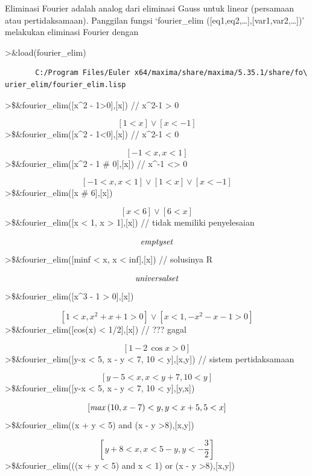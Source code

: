 \documentclass[
]{book}
\begin{document}
Eliminasi Fourier adalah analog dari eliminasi Gauss untuk linear (persamaan atau pertidaksamaan). Panggilan fungsi `fourier\_elim ({[}eq1,eq2,\ldots{]},{[}var1,var2,\ldots{]})' melakukan eliminasi Fourier dengan

\textgreater\&load(fourier\_elim)

\begin{verbatim}
       C:/Program Files/Euler x64/maxima/share/maxima/5.35.1/share/fo\
urier_elim/fourier_elim.lisp
\end{verbatim}

\textgreater\$\&fourier\_elim({[}x\^{}2 - 1\textgreater0{]},{[}x{]}) // x\^{}2-1 \textgreater{} 0

\[\left[ 1<x \right] \lor \left[ x<-1 \right] \]\textgreater\$\&fourier\_elim({[}x\^{}2 - 1\textless0{]},{[}x{]}) // x\^{}2-1 \textless{} 0

\[\left[ -1<x , x<1 \right] \]\textgreater\$\&fourier\_elim({[}x\^{}2 - 1 \# 0{]},{[}x{]}) // x\^{}-1 \textless\textgreater{} 0

\[\left[ -1<x , x<1 \right] \lor \left[ 1<x \right] \lor \left[ x<-1   \right] \]\textgreater\$\&fourier\_elim({[}x \# 6{]},{[}x{]})

\[\left[ x<6 \right] \lor \left[ 6<x \right] \]\textgreater\$\&fourier\_elim({[}x \textless{} 1, x \textgreater{} 1{]},{[}x{]}) // tidak memiliki penyelesaian

\[{\it emptyset}\]\textgreater\$\&fourier\_elim({[}minf \textless{} x, x \textless{} inf{]},{[}x{]}) // solusinya R

\[{\it universalset}\]\textgreater\$\&fourier\_elim({[}x\^{}3 - 1 \textgreater{} 0{]},{[}x{]})

\[\left[ 1<x , x^2+x+1>0 \right] \lor \left[ x<1 , -x^2-x-1>0   \right] \]\textgreater\$\&fourier\_elim({[}cos(x) \textless{} 1/2{]},{[}x{]}) // ??? gagal

\[\left[ 1-2\,\cos x>0 \right] \]\textgreater\$\&fourier\_elim({[}y-x \textless{} 5, x - y \textless{} 7, 10 \textless{} y{]},{[}x,y{]}) // sistem pertidaksamaan

\[\left[ y-5<x , x<y+7 , 10<y \right] \]\textgreater\$\&fourier\_elim({[}y-x \textless{} 5, x - y \textless{} 7, 10 \textless{} y{]},{[}y,x{]})

\[\left[ {\it max}\left(10 , x-7\right)<y , y<x+5 , 5<x \right] \]\textgreater\$\&fourier\_elim((x + y \textless{} 5) and (x - y \textgreater8),{[}x,y{]})

\[\left[ y+8<x , x<5-y , y<-\frac{3}{2} \right] \]\textgreater\$\&fourier\_elim(((x + y \textless{} 5) and x \textless{} 1) or (x - y \textgreater8),{[}x,y{]})
\end{document}
